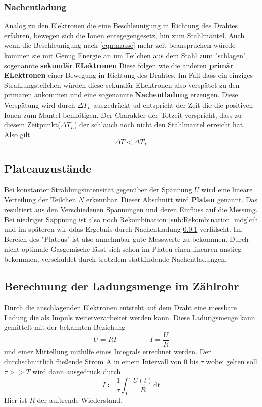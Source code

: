 \subsubsection{Nachentladung}
\label{sub:Nachentladung}
Analog zu den Elektronen die eine Beschleunigung in Richtung des Drahtes erfahren, bewegen sich die Ionen entegegengesetz, hin zum Stahlmantel.
Auch wenn die Beschleunigung nach \eqref{eqn:masse} mehr zeit beanspruchen würede kommen sie mit Genug Energie an um Teilchen aus dem Stahl zum "schlagen", sogenannte \textbf{sekundär ELektronen}
Diese folgen wie die anderen \textbf{primär ELektronen} einer Bewegung in Richtung des Drahtes. Im Fall dass ein einziges Strahlungsteilchen würden diese sekundär ELektronen also verspätet zu den primären ankommen
und eine sogenannte \textbf{Nachentladung} erzeugen. Diese Verspätung wird durch $\Delta T_L$ ausgedrückt ud entspricht der Zeit die die positiven Ionen zum Mantel bennötigen.
Der Charakter der Totzeit verspricht, dass zu diesem Zeitpunkt($\Delta T_L$) der schlauch noch nicht den Stahlmantel erreicht hat. Also gilt
\begin{equation*}
\label{eqn:vergleich}
\Delta T < \Delta T_L
\end{equation*}

\subsection{Plateauzustände}
Bei konstanter Strahlungsintensität gegenüber der Spannung $U$ wird eine lineare Verteilung der Teilchen $N$ erkennbar. Dieser Abschnitt wird 
\textbf{Plateu} genannt. Das resultiert aus den Verschiedenen Spannungen und deren Einfluss auf die Messung. Bei niedriger Sappnung ist also noch Rekombination \ref{sub:Rekombination} möglcih und im späteren wir ddas Ergebnis durch Nachentladung \ref{sub:Nachentladung} verfälscht. 
Im Bereich des "Plateus" ist also annehmbar gute Messwerte zu bekommen. Durch nicht optimale Gasgemische lässt sich schon im Plateu einen linearen anstieg bekommen,
verschuldet durch trotzdem stattfindende Nachentladungen.


\subsection{Berechnung der Ladungsmenge im Zählrohr}
Durch die auschlagenden Elektronen entsteht auf dem Draht eine messbare Ladung die als Impuls weiterverarbeitet werden kann.
Diese Ladungsmenge kann gemittelt mit der bekannten Beziehung
\begin{equation*}
U=RI \hspace{2cm} I=\frac{U}{R}
\end{equation*}
und einer Mittellung mithilfe eines Integrals errechnet werden.
Der durchschnittlich fließende Strom $\si{\ampere}$ in einem Intervall von $0$ bis $\tau$ wobei gelten soll $\tau>>T$ wird dann ausgedrück durch
\begin{equation}
\label{eqn:ladungsmenge}
\bar{I} \coloneqq \frac{1}{\tau} \int_{0}^{\tau} \frac{U(t)}{R} \text{dt}
\end{equation}
Hier ist $R$ der auftrende Wiederstand.

